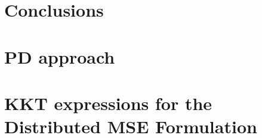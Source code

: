 \documentclass[11pt,draftcls,onecolumn,letterpaper]{./../Styles/IEEEtran}
\begin{document}
\section{Conclusions} \label{sec-6}


\appendices

\section{\acl{PD} approach} \label{a-2}


\section{\ac{KKT} expressions for the Distributed MSE Formulation} \label{a-1}




\end{document}

